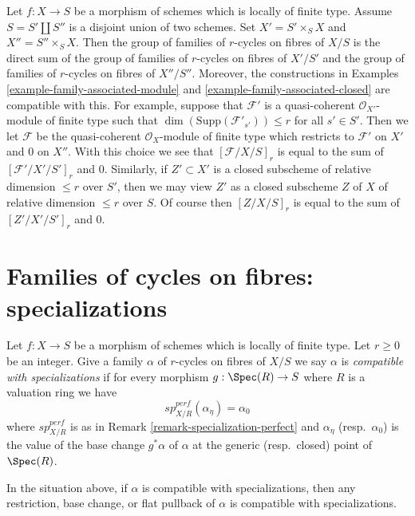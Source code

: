 \begin{remark}
\label{remark-disjoint-decomposition-base}
Let $f : X \to S$ be a morphism of schemes which is locally of
finite type. Assume $S = S' \amalg S''$ is a disjoint union of
two schemes. Set $X' = S' \times_S X$ and $X'' = S'' \times_S X$.
Then the group of families of $r$-cycles on fibres of $X/S$
is the direct sum of the group of families of $r$-cycles on fibres of $X'/S'$
and the group of families of $r$-cycles on fibres of $X''/S''$.
Moreover, the constructions in
Examples \ref{example-family-associated-module} and
\ref{example-family-associated-closed} are compatible with this.
For example, suppose that $\mathcal{F}'$ is a quasi-coherent
$\mathcal{O}_{X'}$-module of finite type such that
$\dim(\text{Supp}(\mathcal{F}'_{s'})) \leq r$ for all $s' \in S'$.
Then we let $\mathcal{F}$ be the quasi-coherent
$\mathcal{O}_X$-module of finite type which restricts to
$\mathcal{F}'$ on $X'$ and $0$ on $X''$.
With this choice we see that $[\mathcal{F}/X/S]_r$
is equal to the sum of $[\mathcal{F}'/X'/S']_r$ and $0$.
Similarly, if $Z' \subset X'$ is a closed subscheme of relative
dimension $\leq r$ over $S'$, then we may view $Z'$ as a closed subscheme
$Z$ of $X$ of relative dimension $\leq r$ over $S$. Of course
then $[Z/X/S]_r$ is equal to the sum of $[Z'/X'/S']_r$ and $0$.
\end{remark}







\section{Families of cycles on fibres: specializations}
\label{section-families-specialization}


\noindent
Let $f : X \to S$ be a morphism of schemes which is locally of finite type.
Let $r \geq 0$ be an integer. Give a family $\alpha$ of $r$-cycles on fibres
of $X/S$ we say $\alpha$ is {\it compatible with specializations} if
for every morphism $g : \Spec(R) \to S$ where $R$ is a valuation ring we have
$$
sp_{X/R}^{perf}(\alpha_\eta) = \alpha_0
$$
where $sp_{X/R}^{perf}$ is as in Remark \ref{remark-specialization-perfect}
and $\alpha_\eta$ (resp.\ $\alpha_0$) is the value of the base change
$g^*\alpha$ of $\alpha$ at the generic (resp.\ closed) point of $\Spec(R)$.

\begin{lemma}
\label{lemma-families-specialization}
In the situation above, if $\alpha$ is compatible with specializations,
then any restriction, base change, or flat pullback of $\alpha$ is compatible
with specializations.
\end{lemma}

